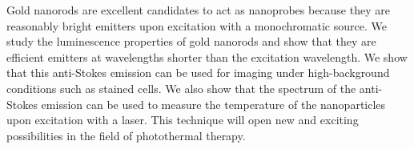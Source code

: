 Gold nanorods are excellent candidates to act as nanoprobes because they are
reasonably bright emitters upon excitation with a monochromatic source. We study
the luminescence properties of gold nanorods and show that they are efficient
emitters at wavelengths shorter than the excitation wavelength. We show that
this anti-Stokes emission can be used for imaging under high-background
conditions such as stained cells. We also show that the spectrum of the
anti-Stokes emission can be used to measure the temperature of the nanoparticles
upon excitation with a laser. This technique will open new and exciting
possibilities in the field of photothermal therapy.
